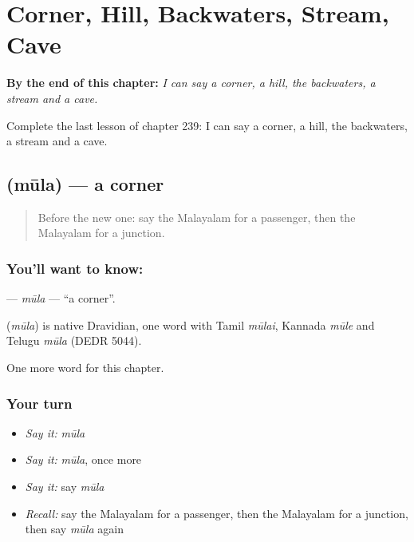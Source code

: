 
\chapter{Corner, Hill, Backwaters, Stream, Cave}
\label{ch:ml-corner-hill-backwaters-stream-cave}

\begin{chapteropening}
\textbf{By the end of this chapter:} \emph{I can say a corner, a hill, the backwaters, a stream and a cave.}

Complete the last lesson of chapter 239: I can say a corner, a hill, the backwaters, a stream and a cave.
\end{chapteropening}

\section[\texorpdfstring{\ml{മൂല} (mūla)}{മൂല (mūla)}]{ (mūla) — a corner}

\label{lesson:ML-C239-mula2}



\begin{quote}
Before the new one: say the Malayalam for a passenger, then the Malayalam for a junction.
\end{quote}

\subsection*{You'll want to know: }
\textbf{} — \emph{mūla} — \textquotedblleft{}a corner\textquotedblright{}.

\begin{cousinweb}
\textbf{} (\emph{mūla}) is native Dravidian, one word with Tamil \emph{mūlai}, Kannada \emph{mūle} and Telugu \emph{mūla} (DEDR 5044).
\end{cousinweb}

\begin{grammarlens}[title={What you've built}]
One more word for this chapter.
\end{grammarlens}

\subsection*{Your turn}
\begin{itemize}
\raggedright
  \item \emph{Say it:} \emph{mūla}
  \item \emph{Say it:} \emph{mūla}, once more
  \item \emph{Say it:} say \emph{mūla}
  \item \emph{Recall:} say the Malayalam for a passenger, then the Malayalam for a junction, then say \emph{mūla} again
\end{itemize}

